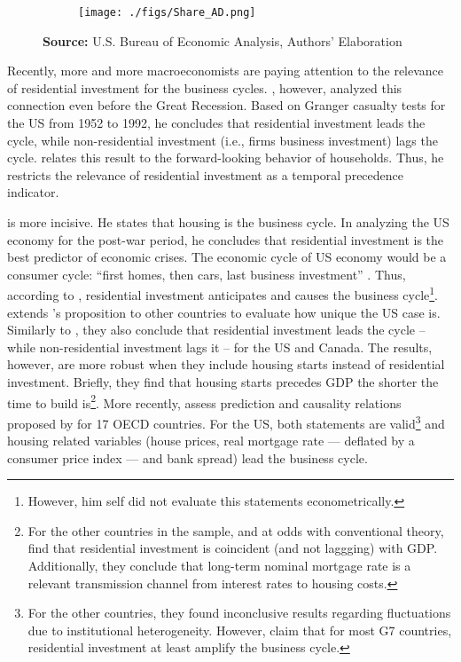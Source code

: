\documentclass[12pt, a4paper]{article}
\begin{document}
\begin{figure}[H]
    \centering
	\caption{Expenditures share on GDP}
	\label{fig:share}
\begin{figure}[htb]
    \texttt{[image: ./figs/Share\_AD.png]}
    \end{figure}
	\caption*{\textbf{Source:} U.S. Bureau of Economic Analysis, Authors' Elaboration}
\end{figure}

Recently, more and more macroeconomists are paying attention to the relevance of residential investment for the business cycles.
\textcite{green_follow_1997}, however, analyzed this connection even before the Great Recession.
Based on Granger casualty tests for the US from 1952 to 1992, he concludes that residential investment leads the cycle, while non-residential investment (i.e., firms business investment) lags the cycle.
\textcite{green_follow_1997} relates this result to the forward-looking behavior of households.
Thus, he restricts the relevance of residential investment as a temporal precedence indicator.

\textcite{leamer_housing_2007} is more incisive. He states that housing is the business cycle.
In analyzing the US economy for the post-war period, he concludes that residential investment is the best predictor of economic crises.
The economic cycle of US economy would be a consumer cycle: ``first homes, then cars, last business investment'' \cite[p.~8]{leamer_housing_2007}.
Thus, according to \textcite{leamer_housing_2007}, residential investment anticipates and causes the business cycle\footnote{However, \textcite{leamer_housing_2007} him self did not evaluate this statements econometrically.}.
\textcite{kydland_2016_housing} extends \citeauthor*{leamer_housing_2007}'s \citeyear{leamer_housing_2007} proposition to other countries to evaluate how unique the US case is.
Similarly to \textcite{green_follow_1997}, they also conclude that residential investment leads the cycle -- while non-residential investment lags it -- for the US and Canada.
The results, however, are more robust when they include housing starts instead of residential investment.
Briefly, they find that housing starts precedes GDP the shorter the time to build is\footnote{For the other countries in the sample, and at odds with conventional theory, \textcite{kydland_2016_housing} find that residential investment is coincident (and not laggging) with GDP. Additionally, they conclude that long-term nominal mortgage rate is a relevant transmission channel from interest rates to housing costs.}.
More recently, \textcite{huang_is_2018} assess  prediction and causality relations proposed by \textcite{leamer_housing_2007} for 17 OECD countries.
For the US, both statements are valid\footnote{For the other countries, they found inconclusive results regarding fluctuations due to institutional heterogeneity. However, \textcite{huang_is_2018} claim that for most G7 countries, residential investment at least amplify the business cycle.} and housing related variables (house prices, real mortgage rate --- deflated by a consumer price index --- and bank spread) lead the business cycle.
\end{document}
